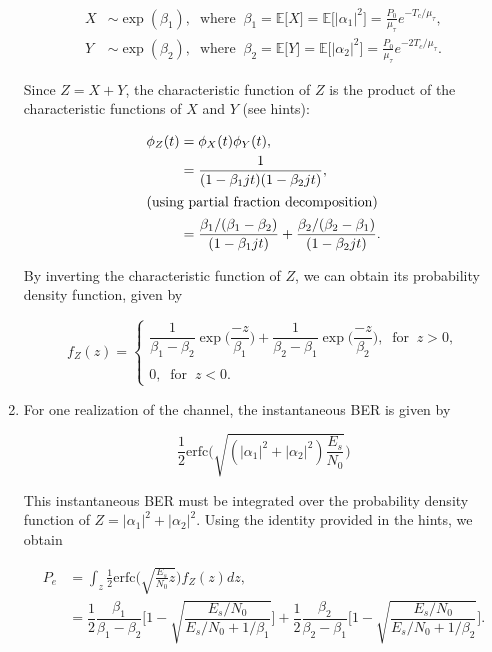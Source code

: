 \documentclass [a4paper, 11pt] {article}
\begin{document}
\begin{solution}
\begin{enumerate}
\begin{align}
    X &\sim \exp(\beta_1), \; \; \text{where} \; \; \beta_1 = \mathbb{E}\big[X\big] = \mathbb{E}\big[|\alpha_1|^2\big] = \frac{P_0}{\mu_\tau}e^{-T_c/\mu_\tau},\\
    Y &\sim \exp(\beta_2), \; \; \text{where} \; \; \beta_2 = \mathbb{E}\big[Y\big] = \mathbb{E}\big[|\alpha_2|^2\big] = \frac{P_0}{\mu_\tau}e^{-2T_c/\mu_\tau}.
\end{align}

Since $Z = X + Y$, the characteristic function of $Z$ is the product of the characteristic functions of $X$ and $Y$ (see hints):

\begin{align}
\phi_Z(t) &= \phi_X(t)\phi_Y(t),\\
&= \dfrac{1}{(1-\beta_1 jt)(1-\beta_2 jt)},\\ \intertext{(using partial fraction decomposition)}
&= \dfrac{\beta_1/(\beta_1-\beta_2)}{(1-\beta_1 jt)} + \dfrac{\beta_2/(\beta_2-\beta_1)}{(1-\beta_2 jt)}.
\end{align}

By inverting the characteristic function of $Z$, we can obtain its probability density function, given by

\begin{equation}
    f_Z(z)=\left\{
                \begin{array}{ll}
                  \dfrac{1}{\beta_1-\beta_2}\exp\Big( \dfrac{-z}{\beta_1}\Big) + \dfrac{1}{\beta_2-\beta_1}\exp\Big( \dfrac{-z}{\beta_2}\Big),\; \; \text{for} \; \; z > 0, \\
                  \\
                0, \; \; \text{for} \; \; z < 0.
                \end{array}
              \right.
\end{equation}

\item For one realization of the channel, the instantaneous BER is given by

\begin{equation}
    \frac{1}{2}\text{erfc}\Bigg(\sqrt{(|\alpha_1|^2+|\alpha_2|^2) \frac{E_s}{N_0}}\Bigg)
\end{equation}

This instantaneous BER must be integrated over the probability density function of $Z = |\alpha_1|^2+|\alpha_2|^2$. Using the identity provided in the hints, we obtain

\begin{align}
    P_e &= \int_{z}\frac{1}{2}\text{erfc}\Bigg(\sqrt{\frac{E_s}{N_0}z}\Bigg)f_Z(z) dz,\\
    &= \dfrac{1}{2}\dfrac{\beta_1}{\beta_1-\beta_2}\Bigg[ 1 - \sqrt{\dfrac{E_s/N_0}{E_s/N_0 + 1/\beta_1}} \Bigg] + \dfrac{1}{2}\dfrac{\beta_2}{\beta_2-\beta_1}\Bigg[ 1 - \sqrt{\dfrac{E_s/N_0}{E_s/N_0 + 1/\beta_2}} \Bigg].
\end{align}


\end{enumerate}
\end{solution}
\end{document}
